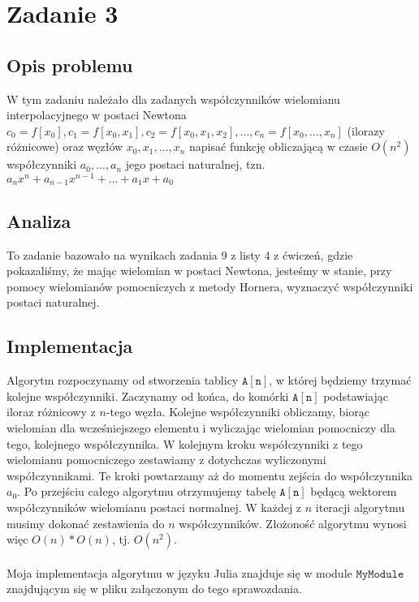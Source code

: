 \section{Zadanie 3}
\subsection{Opis problemu}
W tym zadaniu należało dla zadanych współczynników wielomianu interpolacyjnego w postaci Newtona $c_0 = f[x_0], c_1 = f[x_0, x_1], c_2 = f[x_0, x_1, x_2], \ldots, c_n = f[x_0, \ldots, x_n] $ (ilorazy różnicowe) oraz węzłów $x_0, x_1, \ldots, x_n$ napisać funkcję obliczającą w czasie $O(n^2)$ współczynniki $a_0, \ldots, a_n$ jego postaci naturalnej, tzn. $ a_nx^n + a_{n-1}x^{n-1} + \ldots + a_1x + a_0 $
\subsection{Analiza}
To zadanie bazowało na wynikach zadania 9 z listy 4 z ćwiczeń, gdzie pokazaliśmy, że mając wielomian w postaci Newtona, jesteśmy w stanie, przy pomocy wielomianów pomocniczych z metody Hornera, wyznaczyć współczynniki postaci naturalnej.
\subsection{Implementacja}
Algorytm rozpoczynamy od stworzenia tablicy $ \mathtt{A[n]}$, w której będziemy trzymać kolejne współczynniki. Zaczynamy od końca, do komórki $ \mathtt{A[n]}$ podstawiając iloraz różnicowy z $n$-tego węzła. Kolejne współczynniki obliczamy, biorąc wielomian dla wcześniejszego elementu i wyliczając wielomian pomocniczy dla tego, kolejnego współczynnika. W kolejnym kroku współczynniki z tego wielomianu pomocniczego zestawiamy z dotychczas wyliczonymi współczynnikami. Te kroki powtarzamy aż do momentu zejścia do współczynnika $a_0$. Po przejściu całego algorytmu otrzymujemy tabelę $\mathtt{A[n]}$ będącą wektorem współczynników wielomianu postaci normalnej. W każdej z $n$ iteracji algorytmu musimy dokonać zestawienia do $n$ współczynników. Złożoność algorytmu wynosi więc $O(n) * O(n)$, tj. $O(n^2)$. \\\\ 
Moja implementacja algorytmu w języku Julia znajduje się w module $ \texttt{MyModule} $ znajdującym się w pliku załączonym do tego sprawozdania.
